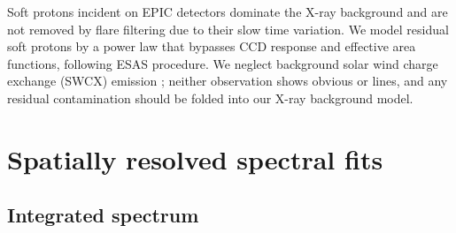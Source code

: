 \documentclass[preprint2,tighten,trackchanges]{aastex6}
\begin{document}
Soft protons incident on EPIC detectors dominate the X-ray background
and are not removed by flare filtering due to their slow time variation.
We model residual soft protons by a power law that bypasses CCD response and
effective area functions, following ESAS procedure.
We neglect background solar wind charge exchange (SWCX) emission
\citep{snowden2004, carter2011};
neither observation shows obvious  or  lines, and any
residual contamination should be folded into our X-ray background model.


\section{Spatially resolved spectral fits} \label{sec:spec}

\subsection{Integrated spectrum} \label{sec:src-bkg}
\end{document}
